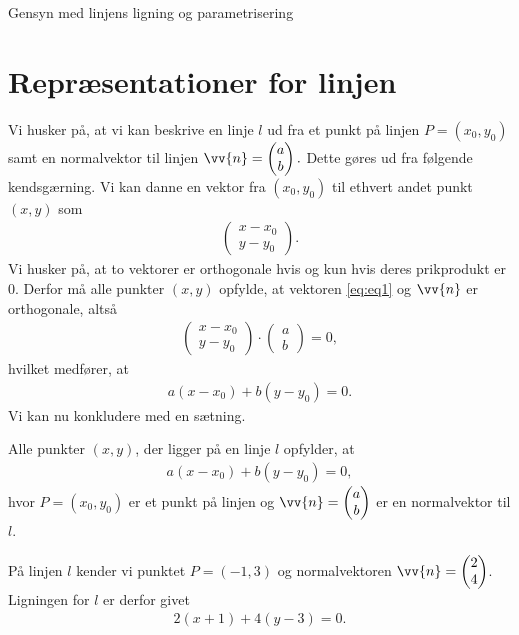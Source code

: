 
\begin{center}
\Huge
Gensyn med linjens ligning og parametrisering
\end{center}

\section*{Repræsentationer for linjen}

Vi husker på, at vi kan beskrive en linje $l$ ud fra et punkt på linjen $P=(x_0,y_0)$ samt en normalvektor til linjen $\vv{n} = \begin{pmatrix}a\\ b\end{pmatrix}.$ Dette gøres ud fra følgende kendsgærning. Vi kan danne en vektor fra $(x_0,y_0)$ til ethvert andet punkt $(x,y)$ som \begin{align}\label{eq:eq1}
\begin{pmatrix}
x-x_0\\y-y_0
\end{pmatrix}.
\end{align}
Vi husker på, at to vektorer er orthogonale hvis og kun hvis deres prikprodukt er 0. Derfor må alle punkter $(x,y)$ opfylde, at vektoren \eqref{eq:eq1} og $\vv{n}$ er orthogonale, altså
\begin{align*}
\begin{pmatrix}
x-x_0\\ y-y_0
\end{pmatrix} \cdot 
\begin{pmatrix}
a\\ b
\end{pmatrix} = 0,
\end{align*}
hvilket medfører, at 
\begin{align*}
a(x-x_0) + b(y-y_0) = 0.
\end{align*}
Vi kan nu konkludere med en sætning.
\begin{setn}
Alle punkter $(x,y)$, der ligger på en linje $l$ opfylder,  at
\begin{align*}
a(x-x_0) + b(y-y_0) = 0,
\end{align*}
hvor $P = (x_0,y_0)$ er et punkt på linjen og $\vv{n} = \begin{pmatrix}
a\\ b
\end{pmatrix}$
er en normalvektor til $l$. 
\end{setn}

\begin{exa}
På linjen $l$ kender vi punktet $P = (-1,3)$ og normalvektoren $\vv{n} = \begin{pmatrix}
2 \\ 4
\end{pmatrix}$. Ligningen for $l$ er derfor givet
\begin{align*}
2(x+1) + 4(y-3) = 0.
\end{align*}
\end{exa}

